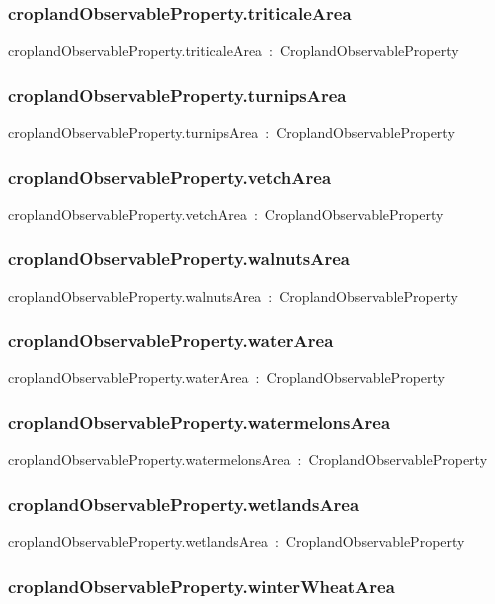 \documentclass{article}
\begin{document}
\subsubsection*{croplandObservableProperty.triticaleArea}

croplandObservableProperty.triticaleArea~:~CroplandObservableProperty

\subsubsection*{croplandObservableProperty.turnipsArea}

croplandObservableProperty.turnipsArea~:~CroplandObservableProperty

\subsubsection*{croplandObservableProperty.vetchArea}

croplandObservableProperty.vetchArea~:~CroplandObservableProperty

\subsubsection*{croplandObservableProperty.walnutsArea}

croplandObservableProperty.walnutsArea~:~CroplandObservableProperty

\subsubsection*{croplandObservableProperty.waterArea}

croplandObservableProperty.waterArea~:~CroplandObservableProperty

\subsubsection*{croplandObservableProperty.watermelonsArea}

croplandObservableProperty.watermelonsArea~:~CroplandObservableProperty

\subsubsection*{croplandObservableProperty.wetlandsArea}

croplandObservableProperty.wetlandsArea~:~CroplandObservableProperty

\subsubsection*{croplandObservableProperty.winterWheatArea}
\end{document}
